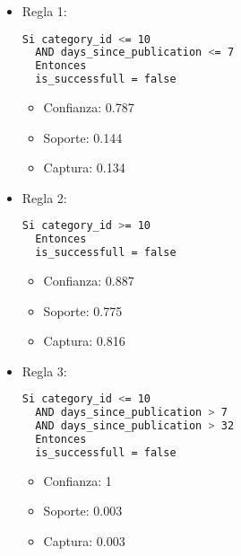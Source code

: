 \begin{itemize}
  \item Regla 1:

\begin{lstlisting}[language=bash, numbers=none]
  Si category_id <= 10
  AND days_since_publication <= 7
  Entonces
  is_successfull = false
\end{lstlisting}

  \begin{itemize}
    \item Confianza: 0.787
    \item Soporte: 0.144
    \item Captura: 0.134
  \end{itemize}


  \item Regla 2:

\begin{lstlisting}[language=bash, numbers=none]
  Si category_id >= 10
  Entonces
  is_successfull = false
\end{lstlisting}

    \begin{itemize}
      \item Confianza: 0.887
      \item Soporte: 0.775
      \item Captura: 0.816
    \end{itemize}

  \item Regla 3:

\begin{lstlisting}[language=bash, numbers=none]
  Si category_id <= 10
  AND days_since_publication > 7
  AND days_since_publication > 32
  Entonces
  is_successfull = false
\end{lstlisting}

    \begin{itemize}
      \item Confianza: 1
      \item Soporte: 0.003
      \item Captura: 0.003
    \end{itemize}


\end{itemize}
